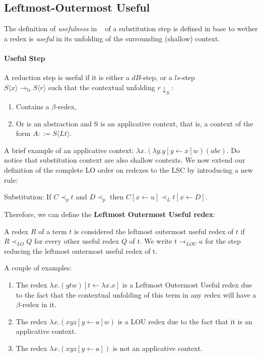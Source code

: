 \documentclass[11pt]{article}
\begin{document}
\subsection{Leftmost-Outermost Useful}\label{lou}
The definition of \textit{usefulness} in ~\cite{beta-invariance} of a substitution step is defined in base to wether a redex is \textit{useful} in its unfolding of the surrounding (shallow) context.
\paragraph{Useful Step} A reduction step is useful if it is either a $dB$-step, or a $ls$-step \\ $S\langle x \rangle \rightarrow_{ls} S\langle r \rangle$ such that the contextual unfolding $r \downarrow_S$:
\begin{enumerate}
  \item Contains a $\beta$-redex,
  \item Or is an abstraction and S is an applicative context, that is, a context of the form $A ::= S\langle Lt \rangle$.
\end{enumerate}
A brief example of an applicative context: $\lambda x . (\lambda y . y[y \leftarrow x]w)(abc)$. Do notice that substitution context are also shallow contexts.
We now extend our definition of the complete LO order on redexes to the LSC by introducing a new rule:
\begin{center}
  Substitution: If $C \prec_p t$ and $D \prec_p$ then $C[x \leftarrow u] \prec_L t[x \leftarrow D]$.
\end{center}
Therefore, we can define the \textbf{Leftmost Outermost Useful redex}:
\begin{center}
  A redex $R$ of a term $t$ is considered the leftmost outermost useful redex of $t$ if $R \prec_{LO} Q$ for every other useful redex $Q$ of $t$. We write $t \rightarrow_{LOU} u$ for the step reducing the leftmost outermost useful redex of t.
\end{center}
A couple of examples:
\begin{enumerate}
	\item The redex $\lambda x . ( y t w) [t \leftarrow \lambda x . x]$ is a Leftmost Outermost Useful redex due to the fact that the contextual unfolding of this term in any redex will have a $\beta$-redex in it.
	\item The redex $\lambda x . (xyz[y \leftarrow a] w)$ is a LOU redex due to the fact that it is an applicative context.
	\item The redex $\lambda x . (xyz[y \leftarrow a])$ is not an applicative context.
\end{enumerate}
\end{document}
